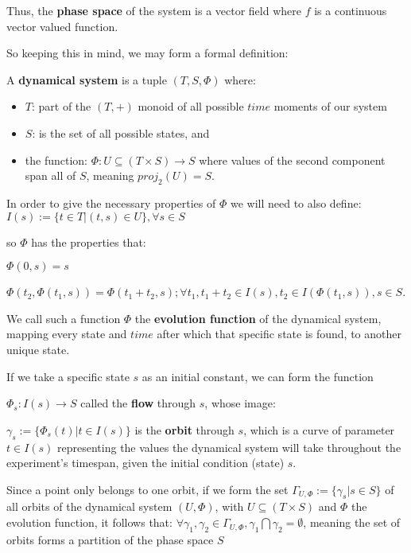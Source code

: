 Thus, the \textbf{phase space} of the system is a vector field where $f$ is a continuous vector valued function.

So keeping this in mind, we may form a formal definition:

\begin{definition}
  A \textbf{dynamical system} is a tuple $(T,S,\Phi)$ where:

  \begin{itemize}
    \item $T$: part of the $(T,+)$ monoid of all possible $time$ moments of our system
    \item $S$: is the set of all possible states, and
    \item the function: $\Phi : U \subseteq (T \times S ) \rightarrow S$ where values of the second component span all of $S$, meaning $proj_2(U) = S$.
  \end{itemize}
  In order to give the necessary properties of $\Phi$ we will need to also define:
  $I(s):= \{ t \in T | (t,s) \in U \}, \forall s \in S$

  so $\Phi$ has the properties that:

  $\Phi(0,s) = s$

  $\Phi(t_2,\Phi(t_1,s)) = \Phi(t_1+t_2,s); \forall t_1, t_1+t_2 \in I(s), t_2 \in I(\Phi(t_1,s)), s \in S$.

  We call such a function $\Phi$ the \textbf{evolution function} of the dynamical system, mapping every state and $time$ after which that specific state is found, to another unique state.
\end{definition}

If we take a specific state $s$ as an initial constant, we can form the function

$\Phi_s : I(s) \rightarrow S$
called the \textbf{flow} through $s$, whose image:

$\gamma_s:=\{\Phi_s(t) | t\in I(s) \}$
is the \textbf{orbit} through $s$,
which is a curve of parameter $t \in I(s)$ representing the values the dynamical system will take throughout the experiment's timespan, given the initial condition (state) $s$.

Since a point only belongs to one orbit, if we form the set
$\Gamma_{U,\Phi}:=\{ \gamma_s | s \in S \}$
of all orbits of the dynamical system $(U,\Phi)$, with $U\subseteq (T \times S)$ and $\Phi$ the evolution function, it follows that:
$\forall \gamma_1,\gamma_2 \in \Gamma_{U, \Phi}, \gamma_1 \bigcap \gamma_2 = \emptyset$, meaning the set of orbits forms a partition of the phase space $S$

